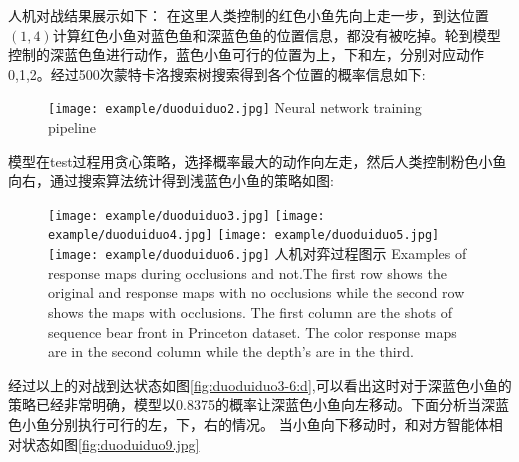 人机对战结果展示如下：
在这里人类控制的红色小鱼先向上走一步，到达位置$(1,4)$计算红色小鱼对蓝色鱼和深蓝色鱼的位置信息，都没有被吃掉。轮到模型控制的深蓝色鱼进行动作，蓝色小鱼可行的位置为上，下和左，分别对应动作0,1,2。经过500次蒙特卡洛搜索树搜索得到各个位置的概率信息如下:
\begin{figure}[!htp]
	\centering
	\texttt{[image: example/duoduiduo2.jpg]}
	{Neural network training pipeline}
	\label{duoduiduo2.png}
\end{figure}
模型在test过程用贪心策略，选择概率最大的动作向左走，然后人类控制粉色小鱼向右，通过搜索算法统计得到浅蓝色小鱼的策略如图:

\begin{figure}[!htp]
	\centering
	{\texttt{[image: example/duoduiduo3.jpg]}}
	\hspace{0.5em}
	{\texttt{[image: example/duoduiduo4.jpg]}}
	\newline
	\centering
	{\texttt{[image: example/duoduiduo5.jpg]}}
	\hspace{0.5em}
	{\texttt{[image: example/duoduiduo6.jpg]}}
	\bicaption
	{人机对弈过程图示}
	{Examples of response maps during occlusions and not.The first row shows the original and response maps with no occlusions while the second row shows the maps with occlusions. The first column are the shots of sequence bear front in Princeton dataset. The color response maps are in the second column while the depth’s are in the third.}
	\label{fig:duoduiduo3-6}
\end{figure}

经过以上的对战到达状态如图\ref{fig:duoduiduo3-6:d},可以看出这时对于深蓝色小鱼的策略已经非常明确，模型以0.8375的概率让深蓝色小鱼向左移动。下面分析当深蓝色小鱼分别执行可行的左，下，右的情况。
当小鱼向下移动时，和对方智能体相对状态如图\ref{fig:duoduiduo9.jpg}


